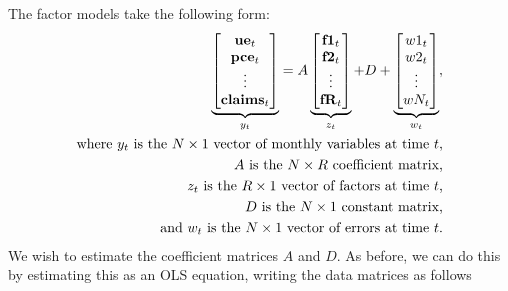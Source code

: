 \documentclass[11pt, letterpaper]{article}\usepackage[]{graphicx}\usepackage[]{color}
\newcommand{\vv}[1]{\textcolor{black}{\mathbf{#1}}}
\begin{document}
The factor models take the following form:
\begin{align*}
\underbrace{\begin{bmatrix}
	\vv{ue}_t\\
	\vv{pce}_t\\
	\vdots \\
	\vv{claims}_t
\end{bmatrix}}_{y_t}
=
A
\underbrace{\begin{bmatrix}
	\vv{f1}_{t}\\
	\vv{f2}_{t}\\
	\vdots \\
	\vv{fR}_{t}
\end{bmatrix}}_{z_t}
+
D 
+
\underbrace{\begin{bmatrix}
	w1_t\\
	w2_t\\
	\vdots\\
	wN_t
\end{bmatrix}}_{w_t},\\
\text{where $y_t$ is the $N \times 1$ vector of monthly variables at time $t$,}\\
\text{$A$ is the $N \times R$ coefficient matrix,}\\
\text{$z_t$ is the $R \times 1$ vector of factors at time $t$,}\\
\text{$D$ is the $N \times 1$ constant matrix,}\\
\text{and $w_t$ is the $N \times 1$ vector of errors at time $t$.}\\
\end{align*}
We wish to estimate the coefficient matrices $A$ and $D$. As before, we can do this by estimating this as an OLS equation, writing the data matrices as follows
\end{document}
